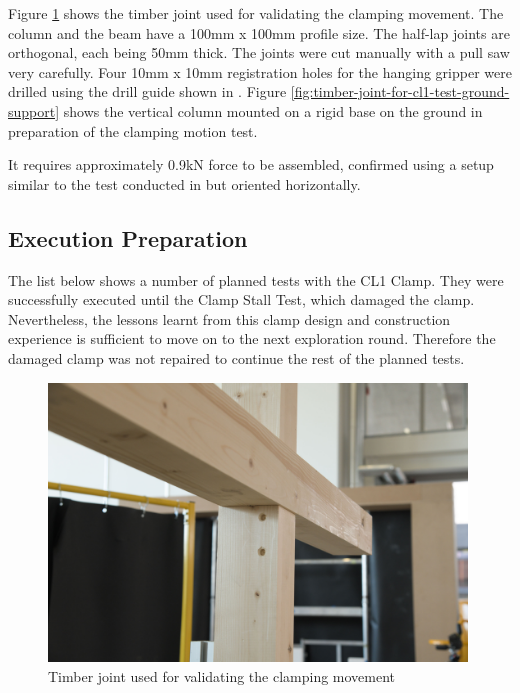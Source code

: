 Figure \ref{fig:timber-joint-for-cl1-test} shows the timber joint used for validating the clamping movement. The column and the beam have a 100mm x 100mm profile size. The half-lap joints are orthogonal, each being 50mm thick. The joints were cut manually with a pull saw very carefully. Four 10mm x 10mm registration holes for the hanging gripper were drilled using the drill guide shown in . Figure \ref{fig:timber-joint-for-cl1-test-ground-support} shows the vertical column mounted on a rigid base on the ground in preparation of the clamping motion test.



It requires approximately 0.9kN force to be assembled, confirmed using a setup similar to the test conducted in  but oriented horizontally.

\subsection{Execution Preparation}
\label{subsection:exploration-1-execution-plan}

The list below shows a number of planned tests with the CL1 Clamp. They were successfully executed until the Clamp Stall Test, which damaged the clamp. Nevertheless, the lessons learnt from this clamp design and construction experience is sufficient to move on to the next exploration round. Therefore the damaged clamp was not repaired to continue the rest of the planned tests.

\begin{figure}
    \centering
    \includegraphics[width=0.99\textwidth]{images/04-4+5/cl1-test-wood.jpg}
    \caption{Timber joint used for validating the clamping movement}
    \label{fig:timber-joint-for-cl1-test}
\end{figure}


